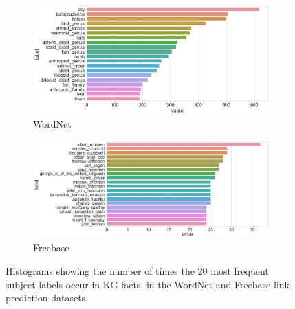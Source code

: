 
\begin{figure}[H]
	\begin{subfigure}[b]{.5\linewidth}
   		\centering
    		\includegraphics[width=1.0\linewidth, height=0.6\linewidth]{Wordnet_Subject_Counts}
		\captionsetup{justification=centering}
		\caption{WordNet}
	\end{subfigure}
	\begin{subfigure}[b]{.5\linewidth}
   		\centering
		\includegraphics[width=1.0\linewidth, height=0.6\linewidth]{Freebase_Subject_Counts}
		\captionsetup{justification=centering}
		\caption{Freebase}
	\end{subfigure}
	\caption{Histograms showing the number of times the 20 most frequent subject labels occur in KG facts, in the WordNet and Freebase link prediction datasets.}
\end{figure}


